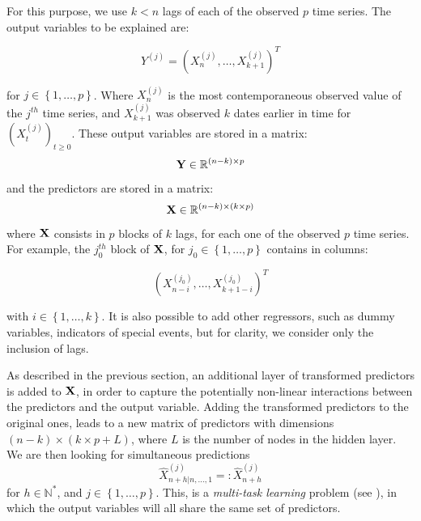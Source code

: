 For this purpose, we use $k < n$ lags of each of the observed $p$ time
series. The output variables to be explained are:

\begin{equation}
Y^{(j)} = \left(X^{(j)}_n, \ldots, X^{(j)}_{k+1} \right)^T
\end{equation}

for $j \in \left\lbrace 1, \ldots,
p \right\rbrace$. Where $X^{(j)}_n$ is the most contemporaneous observed value
of the $j^{th}$ time series, and $X^{(j)}_{k+1}$ was observed $k$ dates earlier
in time for $(X^{(j)}_t)_{t \geq 0}$. These output variables are stored in a
matrix: $$ {\bf Y} \in \mathbb{R}^{(n-k) \times p} $$ and the predictors are
stored in a matrix: $$ {\bf X} \in \mathbb{R}^{(n-k) \times (k \times p)} $$
where ${\bf X}$ consists in $p$ blocks of $k$ lags, for each one of the observed
$p$ time series. For example, the $j_0^{th}$ block of ${\bf X}$, for $j_0 \in
\left\lbrace 1, \ldots, p \right\rbrace$  contains in columns:

\begin{equation}
\left( X^{(j_0)}_{n-i}, \ldots, X^{(j_0)}_{k+1-i} \right)^T
\end{equation}

with $i \in
\left\lbrace 1, \ldots, k \right\rbrace$. It is also possible to add other
regressors, such as dummy variables, indicators of special events, but for
clarity, we consider only the inclusion of lags.

\medskip

As described in the previous section, an additional layer of transformed  predictors is added to ${\bf X}$, in order to capture the potentially non-linear
interactions between the predictors and the output variable. Adding the transformed predictors to the original ones, leads to a new matrix of predictors with
dimensions $(n-k) \times (k \times p + L)$, where $L$ is the number of nodes in
the hidden layer. We are then looking for simultaneous predictions $$ \hat{X}^{(j)}_{n+h|n, \ldots, 1} =:
\hat{X}^{(j)}_{n+h} $$ for $h \in \mathbb{N}^*$, and $j \in \left\lbrace 1,
\ldots, p \right\rbrace$. This, is a \textit{multi-task learning} problem (see \cite{caruana1998multitask}), in which the output variables will all share the same set of predictors.

\medskip

